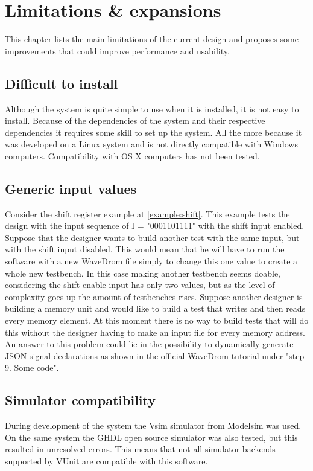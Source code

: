 \clearpage
\section{Limitations \& expansions}\label{LE}
This chapter lists the main limitations of the current design and proposes some improvements that could improve performance and usability.
\subsection{Difficult to install}
Although the system is quite simple to use when it is installed, it is not easy to install. Because of the dependencies of the system and their respective dependencies it requires some skill to set up the system. All the more because it was developed on a Linux system and is not directly compatible with Windows computers. Compatibility with OS X computers has not been tested.
\subsection{Generic input values}
Consider the shift register example at \ref{example:shift}. This example tests the design with the input sequence of I = "0001101111" with the shift input enabled. Suppose that the designer wants to build another test with the same input, but with the shift input disabled. This would mean that he will have to run the software with a new WaveDrom file simply to change this one value to create a whole new testbench. In this case making another testbench seems doable, considering the shift enable input has only two values, but as the level of complexity goes up the amount of testbenches rises.
\npar
Suppose another designer is building a memory unit and would like to build a test that writes and then reads every memory element. At this moment there is no way to build tests that will do this without the designer having to make an input file for every memory address.
\npar
An answer to this problem could lie in the possibility to dynamically generate JSON signal declarations as shown in the official WaveDrom tutorial under "step 9. Some code".
\subsection{Simulator compatibility}
During development of the system the Vsim simulator from Modelsim was used. On the same system the GHDL open source simulator was also tested, but this resulted in unresolved errors. This means that not all simulator backends supported by VUnit are compatible with this software.
